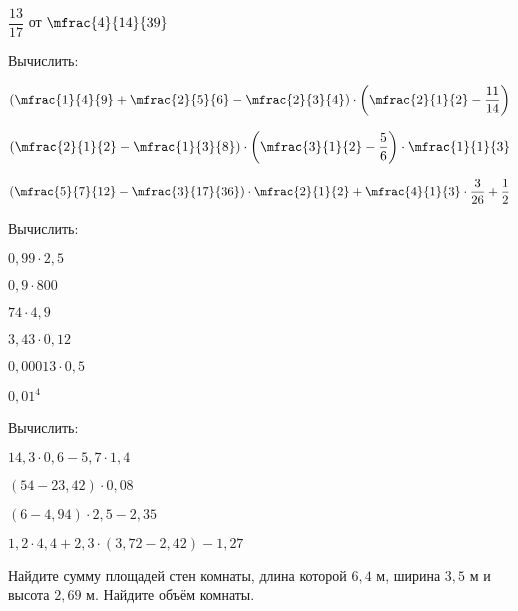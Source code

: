 \begin{homework}[number=1]
\begin{listofex}
\begin{enumcols}[itemcolumns=3]
			\item \( \dfrac{13}{17} \) от \( \mfrac{4}{14}{39} \)
		\end{enumcols}
		\item Вычислить: %
		\begin{enumcols}[itemcolumns=2]
			\item \( \left( \mfrac{1}{4}{9}+\mfrac{2}{5}{6}-\mfrac{2}{3}{4} \right)\cdot\left( \mfrac{2}{1}{2}-\dfrac{11}{14} \right) \)
			\item \( \left( \mfrac{2}{1}{2}-\mfrac{1}{3}{8} \right)\cdot\left( \mfrac{3}{1}{2}-\dfrac{5}{6} \right)\cdot\mfrac{1}{1}{3} \)
			\item \( \left( \mfrac{5}{7}{12}-\mfrac{3}{17}{36} \right)\cdot\mfrac{2}{1}{2}+\mfrac{4}{1}{3}\cdot\dfrac{3}{26}+\dfrac{1}{2} \)
		\end{enumcols}
		\item Вычислить:
		\begin{enumcols}[itemcolumns=3]
			\item \( 0,99\cdot2,5 \)
			\item \( 0,9\cdot800 \)
			\item \( 74\cdot4,9 \)
			\item \( 3,43\cdot0,12 \)
			\item \( 0,00013\cdot0,5 \)
			\item \( 0,01^4 \)
		\end{enumcols}
		\item Вычислить:
		\begin{enumcols}[itemcolumns=2]
			\item \( 14,3\cdot0,6-5,7\cdot1,4 \)
			\item \( (54-23,42)\cdot0,08 \)
			\item \( (6-4,94)\cdot2,5-2,35 \)
			\item \( 1,2\cdot4,4+2,3\cdot(3,72-2,42)-1,27 \)
		\end{enumcols}
		\item Найдите сумму площадей стен комнаты, длина которой \( 6,4 \) м, ширина \( 3,5 \) м и
		высота \( 2,69 \) м. Найдите объём комнаты.
	\end{listofex}
\end{homework}
